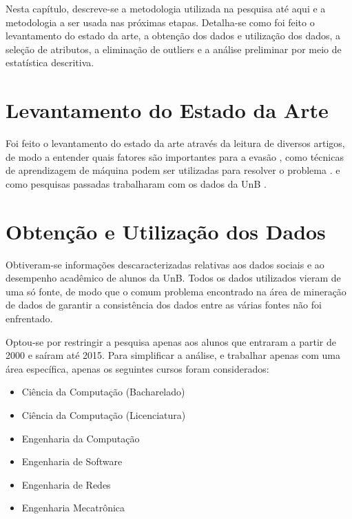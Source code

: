 Nesta capítulo, descreve-se a metodologia utilizada na pesquisa até aqui e a
metodologia a ser usada nas próximas etapas. Detalha-se como foi feito o levantamento
do estado da arte, a obtenção dos dados e utilização dos dados, a seleção de
atributos, a eliminação de outliers e a análise preliminar por meio de estatística
descritiva. 

\section{Levantamento do Estado da Arte}
Foi feito o levantamento do estado da arte através da leitura de diversos artigos, de
modo a entender quais fatores são importantes para a evasão \cite{adeodato}
\cite{hoed_fatores} \cite{dropout_finland}, como técnicas de
aprendizagem de máquina podem ser utilizadas para resolver o problema \cite{adeodato}
 \cite{data_mining_retention}.
e como pesquisas passadas trabalharam com os dados da UnB
\cite{manual_calouro} \cite{hoed_sobrevivencia}. 

\section{Obtenção e Utilização dos Dados}
Obtiveram-se informações descaracterizadas relativas aos dados sociais e ao
desempenho acadêmico de alunos da UnB. Todos os dados utilizados vieram de uma só
fonte, de modo que o comum problema encontrado na área de mineração de dados de
garantir a consistência dos dados entre as várias fontes não foi enfrentado. 
\par Optou-se por restringir a pesquisa apenas aos alunos que entraram a partir de
2000 e saíram até 2015. Para simplificar a análise, e trabalhar apenas com uma área
específica, apenas os seguintes cursos foram considerados: 
\begin{itemize}
    \item Ciência da Computação (Bacharelado)
    \item Ciência da Computação (Licenciatura)
    \item Engenharia da Computação 
    \item Engenharia de Software
    \item Engenharia de Redes
    \item Engenharia Mecatrônica
\end{itemize}

